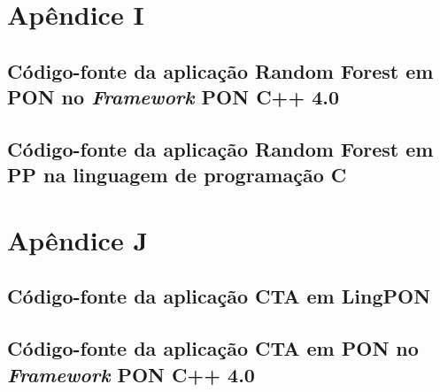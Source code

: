 \chapter*{Apêndice I}\label{ap:rf}
\section*{Código-fonte da aplicação Random Forest em PON no \textit{Framework} PON C++ 4.0}

\section*{Código-fonte da aplicação Random Forest em PP na linguagem de programação C}


\chapter*{Apêndice J}\label{ap:cta}
\section*{Código-fonte da aplicação CTA em LingPON}

\section*{Código-fonte da aplicação CTA em PON no \textit{Framework} PON C++ 4.0}




%